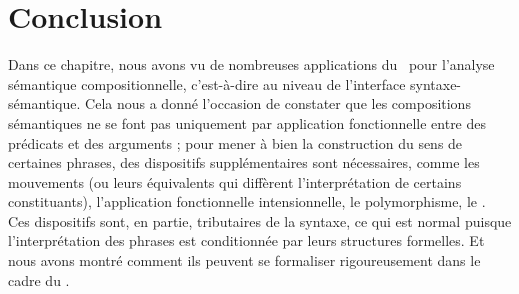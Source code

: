 

\newpage%











\section{Conclusion}
\label{conclu:ISS}

\sloppy

Dans ce chapitre, nous avons vu de nombreuses applications du \lcalcul\ pour l'analyse sémantique compositionnelle, c'est-à-dire au niveau de l'interface syntaxe-sémantique.   Cela nous a donné l'occasion de constater que les compositions sémantiques ne se font pas uniquement par application fonctionnelle entre des prédicats et des arguments ; pour mener à bien la construction du sens de certaines phrases, des dispositifs supplémentaires sont nécessaires, comme les mouvements (ou leurs équivalents qui diffèrent l'interprétation de certains constituants), l'application fonctionnelle intensionnelle, le polymorphisme, le .  
Ces dispositifs sont, en partie, tributaires de la syntaxe, ce qui est normal puisque l'interprétation des phrases est conditionnée par leurs structures formelles.
Et nous avons montré comment ils peuvent se formaliser rigoureusement dans le cadre du  \lcalcul.

\fussy

